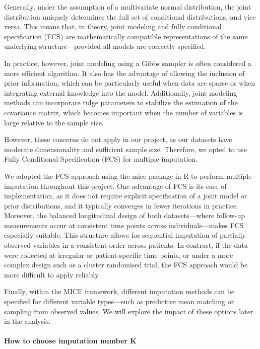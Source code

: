 \documentclass{article}
\begin{document}
Generally, under the assumption of a multivariate normal distribution,
the joint distribution uniquely determines the full set of conditional
distributions, and vice versa. This means that, in theory, joint
modeling and fully conditional specification (FCS) are mathematically
compatible representations of the same underlying structure---provided
all models are correctly specified.

In practice, however, joint modeling using a Gibbs sampler is often
considered a more efficient algorithm. It also has the advantage of
allowing the inclusion of prior information, which can be particularly
useful when data are sparse or when integrating external knowledge into
the model. Additionally, joint modeling methods can incorporate ridge
parameters to stabilize the estimation of the covariance matrix, which
becomes important when the number of variables is large relative to the
sample size.

However, these concerns do not apply in our project, as our datasets
have moderate dimensionality and sufficient sample size. Therefore, we
opted to use Fully Conditional Specification (FCS) for multiple
imputation.

We adopted the FCS approach using the mice package in R to perform
multiple imputation throughout this project. One advantage of FCS is its
ease of implementation, as it does not require explicit specification of
a joint model or prior distributions, and it typically converges in
fewer iterations in practice. Moreover, the balanced longitudinal design
of both datasets---where follow-up measurements occur at consistent time
points across individuals---makes FCS especially suitable. This
structure allows for sequential imputation of partially observed
variables in a consistent order across patients. In contrast, if the
data were collected at irregular or patient-specific time points, or
under a more complex design such as a cluster randomised trial, the FCS
approach would be more difficult to apply reliably.

Finally, within the MICE framework, different imputation methods can be
specified for different variable types---such as predictive mean
matching or sampling from observed values. We will explore the impact of
these options later in the analysis.

\paragraph{How to choose imputation number
K}\label{how-to-choose-imputation-number-k}
\end{document}
